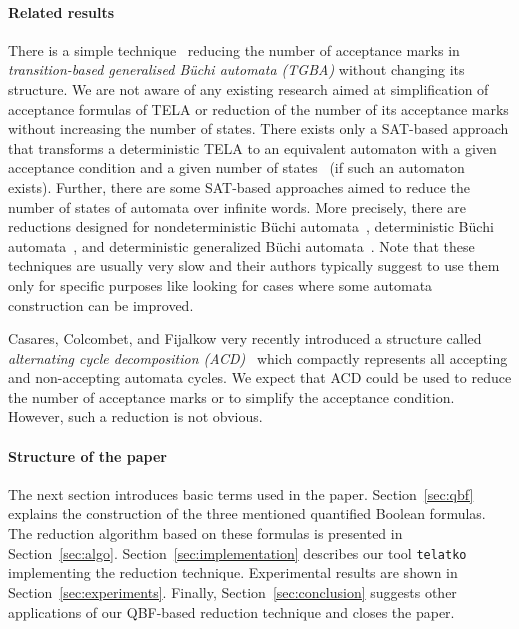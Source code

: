 \documentclass[a4paper,UKenglish,cleveref,autoref,thm-restate]{lipics-v2021}
\newcommand{\telatko}{\texttt{telatko}\xspace}
\begin{document}
\paragraph*{Related results}
There is a simple technique~\cite{babiak.13.spin} reducing the number
of acceptance marks in \emph{transition-based generalised Büchi
  automata (TGBA)} without changing its structure. We are not aware
of any existing research aimed at simplification of acceptance
formulas of TELA or reduction of the number of its acceptance marks
without increasing the number of states. There exists only a SAT-based
approach that transforms a deterministic TELA to an
equivalent automaton with a given acceptance condition and a given
number of states~\cite{baarir.15.lpar} (if such an automaton
exists). Further, there are some SAT-based approaches aimed to reduce
the number of states of automata over infinite words. More precisely,
there are reductions designed for nondeterministic Büchi
automata~\cite{ehlers.10.spin}, deterministic Büchi
automata~\cite{ehlers.10.sat}, and deterministic generalized Büchi
automata~\cite{baarir.14.forte}. Note that these techniques are
usually very slow and their authors typically suggest to use them only
for specific purposes like looking for cases where some automata
construction can be improved.

Casares, Colcombet, and Fijalkow very recently introduced a structure
called \emph{alternating cycle decomposition
  (ACD)}~\cite{casares.21.icalp} which compactly represents
all accepting and non-accepting automata cycles. We
expect that ACD could %
be used to reduce the number of
acceptance marks or to simplify the acceptance condition. However,
such a reduction is not obvious.

\paragraph*{Structure of the paper} The next section introduces basic
terms used in the paper. Section~\ref{sec:qbf} explains the
construction of the three mentioned quantified Boolean formulas. The
reduction algorithm based on these formulas is presented in
Section~\ref{sec:algo}. Section~\ref{sec:implementation} describes our
tool \telatko implementing the reduction technique.  Experimental
results are shown in Section~\ref{sec:experiments}. Finally,
Section~\ref{sec:conclusion} suggests other applications of our
QBF-based reduction technique and closes the paper.
\end{document}
